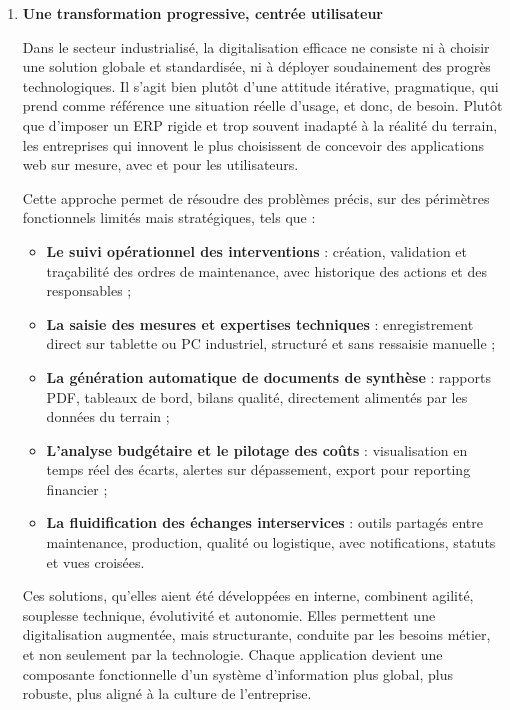 \documentclass[11pt,a4paper]{article}
\begin{document}
\begin{enumerate}
\item \textbf{Une transformation progressive, centrée utilisateur}

Dans le secteur industrialisé, la digitalisation efficace ne consiste ni à choisir une solution globale et standardisée, ni à déployer soudainement des progrès technologiques. Il s’agit bien plutôt d’une attitude itérative, pragmatique, qui prend comme référence une situation réelle d’usage, et donc, de besoin. Plutôt que d’imposer un ERP rigide et trop souvent inadapté à la réalité du terrain, les entreprises qui innovent le plus choisissent de concevoir des applications web sur mesure, avec et pour les utilisateurs. 

Cette approche permet de résoudre des problèmes précis, sur des périmètres fonctionnels limités mais stratégiques, tels que :

\begin{itemize}
    \item \textbf{Le suivi opérationnel des interventions} : création, validation et traçabilité des ordres de maintenance, avec historique des actions et des responsables ;
    
    \item \textbf{La saisie des mesures et expertises techniques} : enregistrement direct sur tablette ou PC industriel, structuré et sans ressaisie manuelle ;
    
    \item \textbf{La génération automatique de documents de synthèse} : rapports PDF, tableaux de bord, bilans qualité, directement alimentés par les données du terrain ;
    
    \item \textbf{L’analyse budgétaire et le pilotage des coûts} : visualisation en temps réel des écarts, alertes sur dépassement, export pour reporting financier ;
    
    \item \textbf{La fluidification des échanges interservices} : outils partagés entre maintenance, production, qualité ou logistique, avec notifications, statuts et vues croisées.
    
\end{itemize}
Ces solutions, qu’elles aient été développées en interne, combinent agilité, souplesse technique, évolutivité et autonomie. Elles permettent une digitalisation augmentée, mais structurante, conduite par les besoins métier, et non seulement par la technologie. Chaque application devient une composante fonctionnelle d’un système d’information plus global, plus robuste, plus aligné à la culture de l’entreprise.


\end{enumerate}
\end{document}
